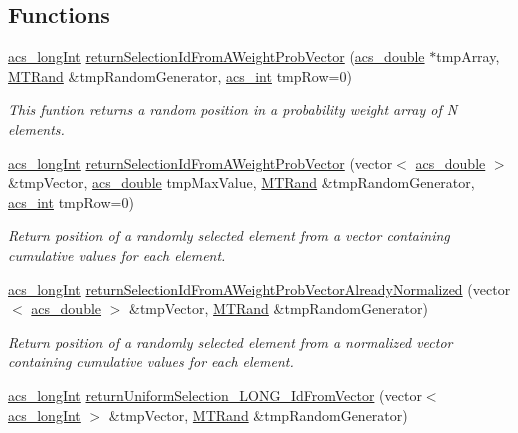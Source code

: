 \subsection*{Functions}
\begin{DoxyCompactItemize}
\item 
\hyperlink{a00024_a19319d75f02db4308bc5c0026d98cd85}{acs\-\_\-long\-Int} \hyperlink{a00028_ab1b8087986873e2bb998bac0e7918b50}{return\-Selection\-Id\-From\-A\-Weight\-Prob\-Vector} (\hyperlink{a00024_ab776853a005fcbf56af0424a2a4dd607}{acs\-\_\-double} $\ast$tmp\-Array, \hyperlink{a00016}{M\-T\-Rand} \&tmp\-Random\-Generator, \hyperlink{a00024_a8d277355641a098190360234e2ebde35}{acs\-\_\-int} tmp\-Row=0)
\begin{DoxyCompactList}\small\item\em This funtion returns a random position in a probability weight array of N elements. \end{DoxyCompactList}\item 
\hyperlink{a00024_a19319d75f02db4308bc5c0026d98cd85}{acs\-\_\-long\-Int} \hyperlink{a00028_ae4d6f026d5445b877a52e326fd95a081}{return\-Selection\-Id\-From\-A\-Weight\-Prob\-Vector} (vector$<$ \hyperlink{a00024_ab776853a005fcbf56af0424a2a4dd607}{acs\-\_\-double} $>$ \&tmp\-Vector, \hyperlink{a00024_ab776853a005fcbf56af0424a2a4dd607}{acs\-\_\-double} tmp\-Max\-Value, \hyperlink{a00016}{M\-T\-Rand} \&tmp\-Random\-Generator, \hyperlink{a00024_a8d277355641a098190360234e2ebde35}{acs\-\_\-int} tmp\-Row=0)
\begin{DoxyCompactList}\small\item\em Return position of a randomly selected element from a vector containing cumulative values for each element. \end{DoxyCompactList}\item 
\hyperlink{a00024_a19319d75f02db4308bc5c0026d98cd85}{acs\-\_\-long\-Int} \hyperlink{a00028_a4135ff15fd24eb8fbfee3d00e1cfbf20}{return\-Selection\-Id\-From\-A\-Weight\-Prob\-Vector\-Already\-Normalized} (vector$<$ \hyperlink{a00024_ab776853a005fcbf56af0424a2a4dd607}{acs\-\_\-double} $>$ \&tmp\-Vector, \hyperlink{a00016}{M\-T\-Rand} \&tmp\-Random\-Generator)
\begin{DoxyCompactList}\small\item\em Return position of a randomly selected element from a normalized vector containing cumulative values for each element. \end{DoxyCompactList}\item 
\hyperlink{a00024_a19319d75f02db4308bc5c0026d98cd85}{acs\-\_\-long\-Int} \hyperlink{a00028_a1cb9cc6ac8ec2ef62b8eb1970e73a11b}{return\-Uniform\-Selection\-\_\-\-L\-O\-N\-G\-\_\-\-Id\-From\-Vector} (vector$<$ \hyperlink{a00024_a19319d75f02db4308bc5c0026d98cd85}{acs\-\_\-long\-Int} $>$ \&tmp\-Vector, \hyperlink{a00016}{M\-T\-Rand} \&tmp\-Random\-Generator)

\end{DoxyCompactItemize}
